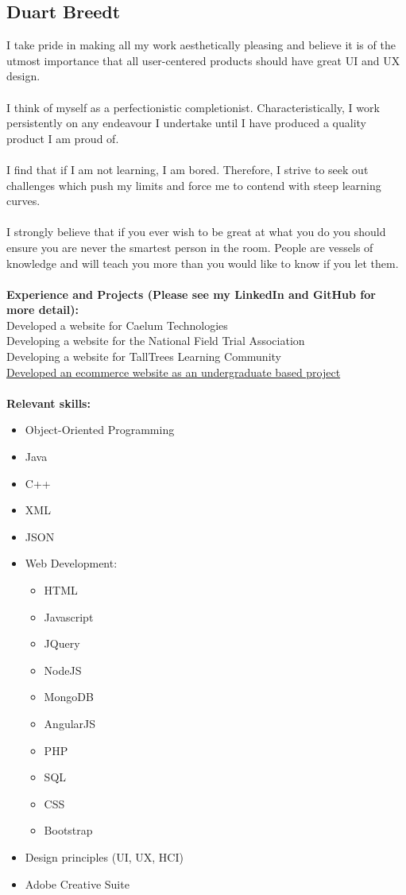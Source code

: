 \documentclass[12pt,a4paper]{article}
\begin{document}
	
		\subsection{Duart Breedt}
		I take pride in making all my work aesthetically pleasing and believe it is of the utmost importance that all user-centered products should have great UI and UX design.\\\\
I think of myself as a perfectionistic completionist. Characteristically, I work persistently on any endeavour I undertake until I have produced a quality product I am proud of.\\\\
I find that if I am not learning, I am bored. Therefore, I strive to seek out challenges which push my limits and force me to contend with steep learning curves.\\\\
I strongly believe that if you ever wish to be great at what you do you should ensure you are never the smartest person in the room. People are vessels of knowledge and will teach you more than you would like to know if you let them.\\\\
		\textbf{\small Experience and Projects (Please see my LinkedIn and GitHub for more detail):}\\
		Developed a website for Caelum Technologies\\
		Developing a website for the National Field Trial Association\\
		Developing a website for TallTrees Learning Community\\
		\href{77-breedt.000webhostapp.com}{Developed an ecommerce website as an undergraduate based project}\\\\
		\textbf{\small Relevant skills:}
		\begin{itemize}
			\item Object-Oriented Programming
			\item Java
			\item C++
			\item XML
			\item JSON
			\item Web Development:
			\begin {itemize}
				\item HTML
				\item Javascript
				\item JQuery
				\item NodeJS
				\item MongoDB
				\item AngularJS
				\item PHP
				\item SQL
				\item CSS
				\item Bootstrap
			\end {itemize}
			\item Design principles (UI, UX, HCI)
			\item Adobe Creative Suite

		\end{itemize}
		
\end{document}
